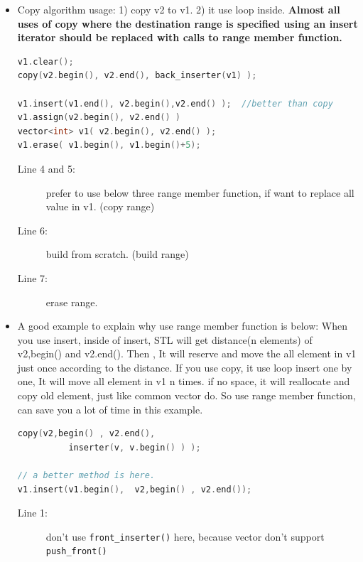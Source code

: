 \documentclass[a4paper,11pt,twoside]{book}
\begin{document}
\begin{itemize}

\item Copy algorithm usage: 1) copy v2 to v1.  2) it use loop inside.  \textbf{Almost all uses of copy where the destination range is specified using an insert iterator should be replaced with calls to range member function.}

\begin{lstlisting}[frame=single, language=c++]
v1.clear();
copy(v2.begin(), v2.end(), back_inserter(v1) );

v1.insert(v1.end(), v2.begin(),v2.end() );  //better than copy
v1.assign(v2.begin(), v2.end() )
vector<int> v1( v2.begin(), v2.end() );
v1.erase( v1.begin(), v1.begin()+5);
\end{lstlisting}
\begin{description}
	\item[Line 4 and 5:] prefer to use below three range member function, if want to replace all value in v1. (copy range)
	
	\item[Line 6:] build from scratch. (build range)
	
	\item[Line 7:]erase range.
\end{description}

\item A good example to explain why use range member function is below: When you use insert, inside of insert,  STL will get distance(n elements) of v2,begin() and v2.end(). Then , It will reserve and move the all element in v1 just once according to the distance.  If you use copy, it use loop insert one by one, It will move all element in v1 n times. if no space, it will reallocate and copy old element, just like common vector do. So use range member function, can save you a lot of time in this example.

\begin{lstlisting}[frame=single, language=c++]
copy(v2,begin() , v2.end(),
          inserter(v, v.begin() ) );

// a better method is here.
v1.insert(v1.begin(),  v2,begin() , v2.end());
\end{lstlisting}
\begin{description}
	\item[Line 1:] don't use \texttt{front\_inserter()} here, because vector don't support \texttt{push\_front()}
\end{description}


\end{itemize}
\end{document}

